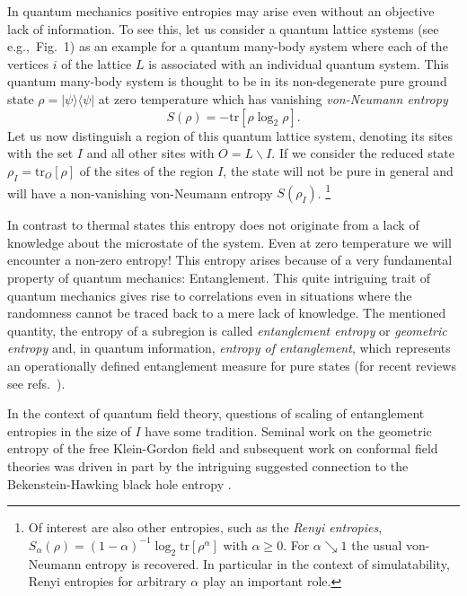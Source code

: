 \documentclass[12pt, rmp,floatfix,epsfig,graphics]{revtex4} %
\begin{document}
In quantum mechanics positive entropies may arise even without an 
objective lack of information. To see this, let us consider a 
quantum lattice systems (see e.g.,\ Fig.\ 1) as an example for a 
quantum many-body system where each of the vertices $i$ of 
the lattice $L$ is associated with an individual quantum system. 
This quantum many-body system is thought to be in its non-degenerate 
pure ground state $\rho=|\psi\rangle\langle\psi|$ at zero temperature
which has vanishing {\it von-Neumann entropy} 
\begin{equation*}
        S(\rho) = - \text{tr}[\rho \log_2 \rho].
\end{equation*}
Let us now distinguish a region of this quantum lattice 
system, denoting its sites with the set $I$ and all other 
sites with $O=L\backslash I$. If we consider the reduced state 
$\rho_I= \text{tr}_{O}[\rho]$ of the sites of the region $I$, 
the state will not be pure in general and will have a 
non-vanishing von-Neumann entropy $S(\rho_I)$.
\footnote{Of interest are also other entropies, such as the 
{\it Renyi entropies}, $S_\alpha(\rho) =(1-\alpha)^{-1} 
\log_2 \text{tr} [\rho^\alpha]$ with $\alpha\geq 0$. For 
$\alpha\searrow 1$ the usual von-Neumann entropy is recovered. 
In particular in the context of simulatability, Renyi entropies 
for arbitrary $\alpha$ play an important role.}

In contrast to thermal states this entropy does not originate 
from a lack of knowledge about the microstate of the system. 
Even at zero temperature we will encounter a non-zero 
entropy! This entropy arises because of a very fundamental property 
of quantum mechanics: Entanglement. This quite intriguing 
trait of quantum mechanics gives rise to correlations even
in situations where the randomness cannot be traced back 
to a mere lack of knowledge. The mentioned quantity, the entropy 
of a subregion is called {\it entanglement entropy} or  
{\it geometric entropy} and, in quantum information,
{\it entropy of entanglement}, which 
 represents an operationally defined entanglement 
measure for pure states (for recent reviews see refs.\ \cite{Horodecki,InHouseReview}).

In the context of quantum field theory, questions of scaling
of entanglement entropies  in the size of $I$ have some tradition. Seminal work on the 
geometric entropy of the free Klein-Gordon field 
\cite{Bombelli,Srednicki} and subsequent work on conformal field
theories \cite{Larsen,Callan,PreskillOld,Calabrese,HardStuff} was 
driven in part by the intriguing suggested connection to the 
Bekenstein-Hawking black hole entropy 
\cite{Bekenstein,Hawking74,BekensteinCP}. 
\end{document}
